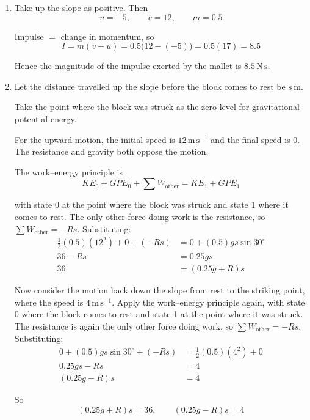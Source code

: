 \documentclass[leqno]{article}
\begin{document}
\begin{enumerate}[
  label=\textbf{\arabic*.},
  leftmargin=*,
  topsep=0pt,
  partopsep=0pt,
  parsep=0pt
]
\vspace*{10pt}

\begin{djsSolution}
\begin{enumerate}[label=\textbf{(\alph*)}]
  \item Take up the slope as positive. Then
  \[
  u=-5,\qquad v=12,\qquad m=0.5
  \]

  Impulse \(=\) change in momentum, so
  \[
  I=m(v-u)=0.5\bigl(12-(-5)\bigr)=0.5(17)=8.5
  \]

  Hence the magnitude of the impulse exerted by the mallet is \(8.5\,\mathrm{N\,s}\).

  \item Let the distance travelled up the slope before the block comes to rest be \(s\,\mathrm{m}\).

  Take the point where the block was struck as the zero level for gravitational potential energy.

  For the upward motion, the initial speed is \(12\,\mathrm{m\,s^{-1}}\) and the final speed is \(0\). The resistance and gravity both oppose the motion.

  The work--energy principle is
  \[
  KE_0+GPE_0+\sum W_{\text{other}}=KE_1+GPE_1
  \]

  with state 0 at the point where the block was struck and state 1 where it comes to rest. The only other force doing work is the resistance, so \(\sum W_{\text{other}}=-Rs\). Substituting:
  \begin{align*}
  \frac12(0.5)(12^2)+0+(-Rs) &= 0 + (0.5)gs\sin30^\circ \\
  36-Rs &= 0.25gs \\
  36 &= (0.25g+R)s
  \end{align*}

  Now consider the motion back down the slope from rest to the striking point, where the speed is \(4\,\mathrm{m\,s^{-1}}\). Apply the work--energy principle again, with state 0 where the block comes to rest and state 1 at the point where it was struck. The resistance is again the only other force doing work, so \(\sum W_{\text{other}}=-Rs\). Substituting:
  \begin{align*}
  0+(0.5)gs\sin30^\circ+(-Rs) &= \frac12(0.5)(4^2)+0 \\
  0.25gs-Rs &= 4 \\
  (0.25g-R)s &= 4
  \end{align*}

  So
  \[
  (0.25g+R)s=36,\qquad (0.25g-R)s=4
  \]


\end{enumerate}
\end{djsSolution}
\end{enumerate}
\end{document}
